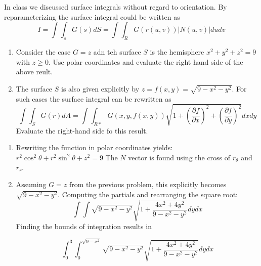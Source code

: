 In class we discussed surface integrals without regard to orientation. By reparameterizing the surface integral could be written as 
\begin{equation*}
I=\int \int_s G\left(s\right)dS=\int \int_R G\left(r\left(u,v\right)\right)\vert N\left(u,v\right)\vert dudv
\end{equation*}

\begin{enumerate}
	\item Consider the case $G=z$ adn teh surface $S$ is the hemisphere $x^2+y^2+z^2=9$ with $z\geq0$. Use polar coordinates and evaluate the right hand side of the above reult. 
	\item The surface $S$ is also given explicitly by $z=f\left(x,y\right)=\sqrt{9-x^2-y^2}$. For such cases the surface integral can be rewritten as 
	\begin{equation}
		\int \int_S G\left(r\right)dA=\int \int_{R*} G(x,y,f(x,y))\sqrt{1+\left(\frac{\partial f}{\partial x}\right)^2+\left(\frac{\partial f}{\partial y}\right)^2}dxdy
		\end{equation}
		Evaluate the right-hand side fo this result.
		
\end{enumerate}

\begin{enumerate}
	\item Rewriting the function in polar coordinates yields: $r^2\cos^2\theta+r^2\sin^2\theta+z^2=9$ The $N$ vector is found using the cross of $r_\theta$ and $r_r$.

	\item Assuming $G=z$ from the previous problem, this explicitly becomes $\sqrt{9-x^2-y^2}$. Computing the partials and rearranging the square root:
	\begin{equation*}
		\int \int \sqrt{9-x^2-y^2}\sqrt{1+\frac{4x^2+4y^2}{9-x^2-y^2}}dydx
	\end{equation*}
	Finding the bounds of integration results in
	
	\begin{equation*}
		\int_0^3 \int_0^{\sqrt{9-x^2}} \sqrt{9-x^2-y^2}\sqrt{1+\frac{4x^2+4y^2}{9-x^2-y^2}}dydx
	\end{equation*} 
\end{enumerate}
			